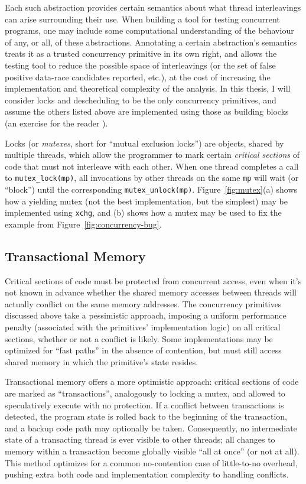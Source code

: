 Each such abstraction provides certain semantics about what thread interleavings can arise surrounding their use.
When building a tool for testing concurrent programs,
one may include some computational understanding of the behaviour of any, or all, of these abstractions.
Annotating a certain abstraction's semantics treats it as a trusted concurrency primitive in its own right,
and allows the testing tool to reduce the possible space of interleavings (or the set of false positive data-race candidates reported, etc.),
at the cost of increasing the implementation and theoretical complexity of the analysis.
In this thesis, I will consider locks and descheduling to be the only concurrency primitives,
and assume the others listed above are implemented using those as building blocks (an exercise for the reader \cite{thrlib}).

Locks (or {\em mutexes}, short for ``mutual exclusion locks'') are objects, shared by multiple threads, which allow the programmer to mark certain {\em critical sections} of code that must not interleave with each other.
When one thread completes a call to {\tt mutex\_lock(mp)}, all invocations by other threads on the same {\tt mp} will wait (or ``block'') until the corresponding {\tt mutex\_unlock(mp)}.
Figure~\ref{fig:mutex}(a) shows how a yielding mutex (not the best implementation, but the simplest) may be implemented using {\tt xchg},
and (b) shows how a mutex may be used to fix the example from Figure~\ref{fig:concurrency-bug}.


\subsection{Transactional Memory}
\label{sec:overview-tm}

Critical sections of code must be protected from concurrent access, even when it's not known in advance whether the shared memory accesses between threads will actually conflict on the same memory addresses.
The concurrency primitives discussed above take a pessimistic approach, imposing a uniform performance penalty (associated with the primitives' implementation logic) on all critical sections, whether or not a conflict is likely.
Some implementations may be optimized for ``fast paths'' in the absence of contention, but must still access shared memory in which the primitive's state resides.

Transactional memory \cite{transactional-memory} offers a more optimistic approach: critical sections of code are marked as ``transactions'', analogously to locking a mutex, and allowed to speculatively execute with no protection.
If a conflict between transactions is detected, the program state is rolled back to the beginning of the transaction, and a backup code path may optionally be taken.
Consequently, no intermediate state of a transacting thread is ever visible to other threads; all changes to memory within a transaction become globally visible ``all at once'' (or not at all).
This method optimizes for a common no-contention case of little-to-no overhead, pushing extra both code and implementation complexity to handling conflicts.

